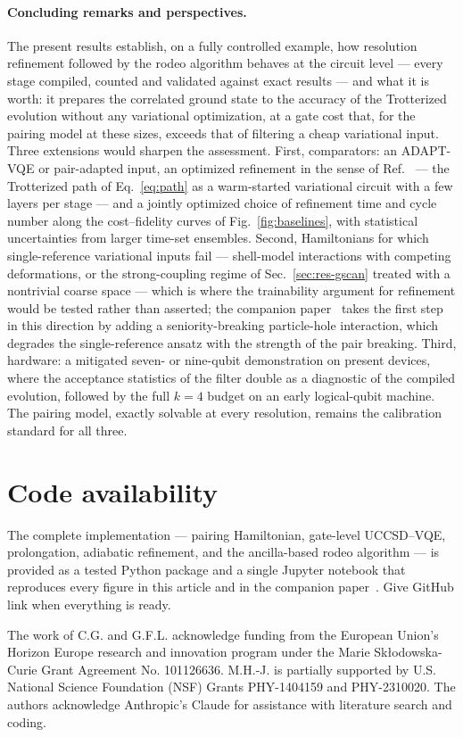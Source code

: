 \documentclass[
  aps,            %
  prc,            %
  reprint,        %
  superscriptaddress,
  floatfix,
  nofootinbib
]{revtex4-2}
\begin{document}
\paragraph{Concluding remarks and perspectives.}
The present results establish, on a fully controlled example, how resolution
refinement followed by the rodeo algorithm behaves at the circuit level ---
every stage compiled, counted and validated against exact results --- and
what it is worth: it prepares the correlated ground state to the accuracy of
the Trotterized evolution without any variational optimization, at a gate
cost that, for the pairing model at these sizes, exceeds that of filtering a
cheap variational input.  Three extensions would sharpen the assessment.
First, comparators: an ADAPT-VQE or pair-adapted input, an optimized
refinement in the sense of Ref.~\cite{Sadia2026} --- the Trotterized path of
Eq.~\eqref{eq:path} as a warm-started variational circuit with a few layers
per stage --- and a jointly optimized choice of refinement time and cycle
number along the cost--fidelity curves of Fig.~\ref{fig:baselines}, with
statistical uncertainties from larger time-set ensembles.  Second, Hamiltonians for which single-reference
variational inputs fail --- shell-model interactions with competing
deformations, or the strong-coupling regime of Sec.~\ref{sec:res-gscan}
treated with a nontrivial coarse space --- which is where the trainability
argument for refinement would be tested rather than asserted; the companion
paper~\cite{PHcompanion} takes the first step in this direction by adding a
seniority-breaking particle-hole interaction, which degrades the
single-reference ansatz with the strength of the pair breaking.  Third,
hardware: a mitigated seven- or nine-qubit demonstration on present devices,
where the acceptance statistics of the filter double as a diagnostic of the
compiled evolution, followed by the full $k=4$ budget on an early
logical-qubit machine.  The pairing model, exactly solvable at every
resolution, remains the calibration standard for all three.

\section*{Code availability}
The complete implementation --- pairing Hamiltonian, gate-level UCCSD--VQE,
prolongation, adiabatic refinement, and the ancilla-based rodeo algorithm ---
is provided as a tested Python package and a single Jupyter notebook that
reproduces every figure in this article and in the companion
paper~\cite{PHcompanion}.
Give GitHub link when everything is ready.
\begin{acknowledgments}
The work of C.G. and G.F.L. acknowledge funding from the
European Union’s Horizon Europe research and innovation program under the Marie Skłodowska-Curie Grant Agreement No.
101126636. M.H.-J. is partially supported by U.S. National Science Foundation
(NSF) Grants PHY-1404159 and PHY-2310020. 
The authors  acknowledge Anthropic’s Claude
for assistance with literature search and coding.

\end{acknowledgments}
\end{document}
